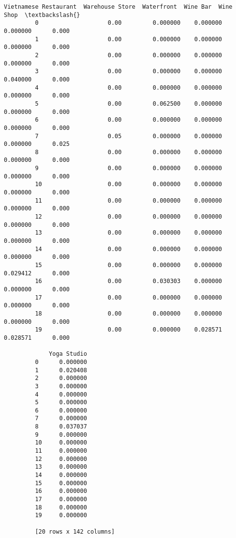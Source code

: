 \documentclass[11pt]{article}
\begin{document}
\begin{Verbatim}[commandchars=\\\{\}]
             Vietnamese Restaurant  Warehouse Store  Waterfront  Wine Bar  Wine Shop  \textbackslash{}
         0                    0.00         0.000000    0.000000  0.000000      0.000   
         1                    0.00         0.000000    0.000000  0.000000      0.000   
         2                    0.00         0.000000    0.000000  0.000000      0.000   
         3                    0.00         0.000000    0.000000  0.040000      0.000   
         4                    0.00         0.000000    0.000000  0.000000      0.000   
         5                    0.00         0.062500    0.000000  0.000000      0.000   
         6                    0.00         0.000000    0.000000  0.000000      0.000   
         7                    0.05         0.000000    0.000000  0.000000      0.025   
         8                    0.00         0.000000    0.000000  0.000000      0.000   
         9                    0.00         0.000000    0.000000  0.000000      0.000   
         10                   0.00         0.000000    0.000000  0.000000      0.000   
         11                   0.00         0.000000    0.000000  0.000000      0.000   
         12                   0.00         0.000000    0.000000  0.000000      0.000   
         13                   0.00         0.000000    0.000000  0.000000      0.000   
         14                   0.00         0.000000    0.000000  0.000000      0.000   
         15                   0.00         0.000000    0.000000  0.029412      0.000   
         16                   0.00         0.030303    0.000000  0.000000      0.000   
         17                   0.00         0.000000    0.000000  0.000000      0.000   
         18                   0.00         0.000000    0.000000  0.000000      0.000   
         19                   0.00         0.000000    0.028571  0.028571      0.000   
         
             Yoga Studio  
         0      0.000000  
         1      0.020408  
         2      0.000000  
         3      0.000000  
         4      0.000000  
         5      0.000000  
         6      0.000000  
         7      0.000000  
         8      0.037037  
         9      0.000000  
         10     0.000000  
         11     0.000000  
         12     0.000000  
         13     0.000000  
         14     0.000000  
         15     0.000000  
         16     0.000000  
         17     0.000000  
         18     0.000000  
         19     0.000000  
         
         [20 rows x 142 columns]
\end{Verbatim}
            
\end{document}
